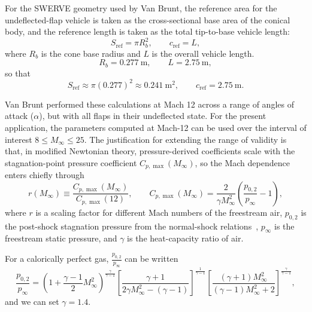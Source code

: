 For the SWERVE geometry used by Van Brunt, the reference area for the undeflected-flap vehicle is taken as the cross-sectional base area of the conical body, and the reference length is taken as the total tip-to-base vehicle length:
\begin{equation}
S_{\mathrm{ref}}=\pi R_b^2,
\qquad
c_{\mathrm{ref}}=L, \label{eq:reference_dims}
\end{equation}
where \(R_b\) is the cone base radius and \(L\) is the overall vehicle length. 
\[
R_b = 0.277~\mathrm{m},
\qquad
L = 2.75~\mathrm{m},
\]
so that
\[
S_{\mathrm{ref}} \approx \pi(0.277)^2 \approx 0.241~\mathrm{m}^2,
\qquad
c_{\mathrm{ref}} = 2.75~\mathrm{m}.
\]

Van Brunt performed these calculations at Mach 12 across a range of angles of attack (\(\alpha\)), but with all flaps in their undeflected state. For the present application, the parameters computed at Mach-12 can be used over the interval of interest \(8 \le M_\infty \le 25\). The justification for extending the range of validity is that, in modified Newtonian theory, pressure-derived coefficients scale with the stagnation-point pressure coefficient \(C_{p,\max}(M_\infty)\), so the Mach dependence enters chiefly through
\begin{equation}
r(M_\infty) \equiv \frac{C_{p,\max}(M_\infty)}{C_{p,\max}(12)},
\qquad
C_{p,\max}(M_\infty)=\frac{2}{\gamma M_\infty^2}\left(\frac{p_{0,2}}{p_\infty}-1\right), \label{eq:mach_scaling}
\end{equation}
where \(r\) is a scaling factor for different Mach numbers of the freestream air, \(p_{0,2}\) is the post-shock stagnation pressure from the normal-shock relations~\cite{naca1135,langley1959}, \(p_\infty\) is the freestream static pressure, and \(\gamma\) is the heat-capacity ratio of air. 

For a calorically perfect gas, \(\frac{p_{0,2}}{p_\infty}\) can be written
\begin{equation}
\frac{p_{0,2}}{p_\infty}
=
\left(1+\frac{\gamma-1}{2}M_\infty^2\right)^{\frac{\gamma}{\gamma-1}}
\left[
\frac{\gamma+1}{2\gamma M_\infty^2-(\gamma-1)}
\right]^{\frac{1}{\gamma-1}}
\left[
\frac{(\gamma+1)M_\infty^2}{(\gamma-1)M_\infty^2+2}
\right]^{\frac{\gamma}{\gamma-1}}, \label{eq:post_shock_pressure}
\end{equation}
and we can set \(\gamma=1.4\). 

